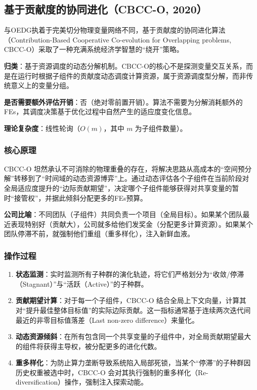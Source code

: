 \subsection{基于贡献度的协同进化（CBCC-O, 2020）}
与OEDG执着于完美切分物理变量网络不同，基于贡献度的协同进化算法（Contribution-Based Cooperative Co-evolution for Overlapping problems, CBCC-O）采取了一种充满系统经济学智慧的“绕开”策略。

\textbf{归类}：基于资源调度的动态分解机制。CBCC-O的核心不是探测变量交互关系，而是在运行时根据子组件的贡献度动态调度计算资源，属于资源调度型分解，而非传统意义上的变量分组。

\textbf{是否需要额外评估开销}：否（绝对零前置开销）。算法不需要为分解消耗额外的FEs，其调度决策基于优化过程中自然产生的适应度变化信息。

\textbf{理论复杂度}：线性轮询（$O(m)$，其中 $m$ 为子组件数量）。

\subsubsection*{核心原理}
CBCC-O 坦然承认不可消除的物理重叠的存在，将解决思路从高成本的“空间预分解”转移到了“时间域的动态资源博弈”上。通过动态评估各个子组件在当前阶段对全局适应度提升的“边际贡献期望”，决定哪个子组件能够获得对共享变量的暂时“接管权”，并据此倾斜分配更多的FEs预算。

\textbf{公司比喻}：不同团队（子组件）共同负责一个项目（全局目标）。如果某个团队最近表现特别好（贡献大），公司就多给他们发奖金（分配更多计算资源）。如果某个团队停滞不前，就强制他们重组（重多样化），注入新鲜血液。

\subsubsection*{操作过程}
\begin{enumerate}
    \item \textbf{状态监测}：实时监测所有子种群的演化轨迹，将它们严格划分为“收敛/停滞（Stagnant）”与“活跃（Active）”的子种群。
    \item \textbf{贡献期望计算}：对于每一个子组件，CBCC-O 结合全局上下文向量，计算其对“提升最佳整体目标值”的实际边际贡献。这一指标通常基于连续两次迭代间最近的非零目标值落差（Last non-zero difference）来量化。
    \item \textbf{动态资源倾斜}：在所有包含同一个共享变量的子组件中，对全局贡献期望最大的组件将获得主导权，被分配更多的进化代数。
    \item \textbf{重多样化}：为防止算力垄断导致系统陷入局部死锁，当某个“停滞”的子种群因历史权重被选中时，CBCC-O 会对其执行强制的重多样化（Re-diversification）操作，强制注入探索动能。
\end{enumerate}


